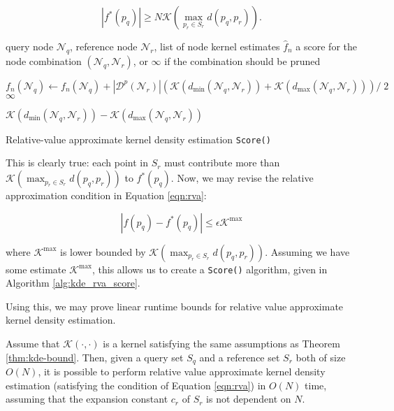\begin{equation}
|f^*(p_q)| \ge N \mathcal{K}\left(\max_{p_r \in S_r} d(p_q, p_r)\right).
\end{equation}

\begin{algorithm}[tb]
  \begin{algorithmic}[1]
     query node $\mathscr{N}_q$, reference node
$\mathscr{N}_r$, list of node kernel estimates $\hat{f}_n$
     a score for the node combination $(\mathscr{N}_q,
\mathscr{N}_r)$, or $\infty$ if the combination should be pruned

    \medskip

\label{alg:rva-kde-prune}
      \STATE $f_n(\mathscr{N}_q) \gets f_n(\mathscr{N}_q) + |
\mathscr{D}^p(\mathscr{N}_r) | \left(\mathcal{K}(d_{\min}(\mathscr{N}_q,
\mathscr{N}_r)) + \mathcal{K}(d_{\max}(\mathscr{N}_q, \mathscr{N}_r))\right)
/\;2$ \label{alg:rva-kde-update}
      \RETURN $\infty$
    \ENDIF

    \RETURN $\mathcal{K}(d_{\min}(\mathscr{N}_q, \mathscr{N}_r)) -
\mathcal{K}(d_{\max}(\mathscr{N}_q, \mathscr{N}_r))$
  \end{algorithmic}

  \caption{Relative-value approximate kernel density estimation
\texttt{Score()}}
  \label{alg:kde_rva_score}
\end{algorithm}

This is clearly true: each point in $S_r$ must contribute more than
$\mathcal{K}(\max_{p_r \in S_r} d(p_q, p_r))$ to $f^*(p_q)$.  Now, we may revise
the relative approximation condition in Equation \ref{eqn:rva}:

\begin{equation}
| f(p_q) - f^*(p_q) | \le \epsilon \mathcal{K}^{\max}
\end{equation}

\noindent where $\mathcal{K}^{\max}$ is lower bounded by $\mathcal{K}(\max_{p_r
\in S_r} d(p_q, p_r))$.  Assuming we have some estimate $\mathcal{K}^{\max}$,
this allows us to create a \texttt{Score()} algorithm, given in Algorithm
\ref{alg:kde_rva_score}.

Using this, we may prove linear runtime bounds for relative value approximate
kernel density estimation.

\begin{thm}
Assume that $\mathcal{K}(\cdot, \cdot)$ is a kernel satisfying the same
assumptions as Theorem \ref{thm:kde-bound}.  Then, given a query set $S_q$ and a
reference set $S_r$ both of size $O(N)$, it is possible to perform relative
value approximate kernel density estimation (satisfying the condition of
Equation \ref{eqn:rva}) in $O(N)$ time, assuming that the expansion constant
$c_r$ of $S_r$ is not dependent on $N$.
\end{thm}

